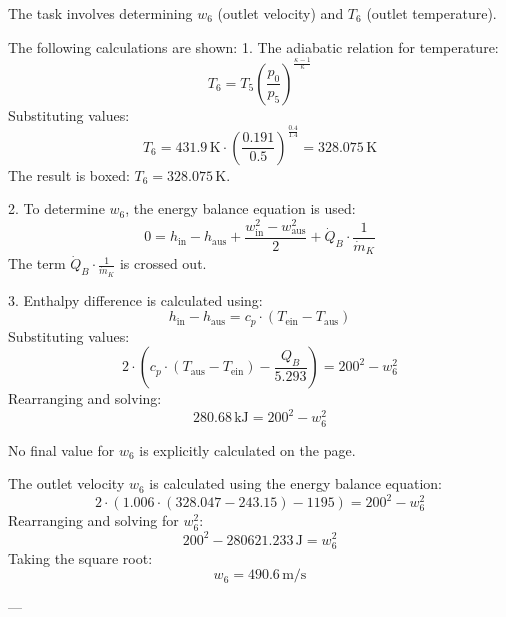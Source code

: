 The task involves determining \( w_6 \) (outlet velocity) and \( T_6 \) (outlet temperature).  

The following calculations are shown:  
1. The adiabatic relation for temperature:  
   \[
   T_6 = T_5 \left( \frac{p_0}{p_5} \right)^{\frac{\kappa - 1}{\kappa}}
   \]  
   Substituting values:  
   \[
   T_6 = 431.9 \, \text{K} \cdot \left( \frac{0.191}{0.5} \right)^{\frac{0.4}{1.4}} = 328.075 \, \text{K}
   \]  
   The result is boxed: \( T_6 = 328.075 \, \text{K} \).  

2. To determine \( w_6 \), the energy balance equation is used:  
   \[
   0 = h_{\text{in}} - h_{\text{aus}} + \frac{w_{\text{in}}^2 - w_{\text{aus}}^2}{2} + \dot{Q}_B \cdot \frac{1}{\dot{m}_K}
   \]  
   The term \( \dot{Q}_B \cdot \frac{1}{\dot{m}_K} \) is crossed out.  

3. Enthalpy difference is calculated using:  
   \[
   h_{\text{in}} - h_{\text{aus}} = c_p \cdot (T_{\text{ein}} - T_{\text{aus}})
   \]  
   Substituting values:  
   \[
   2 \cdot \left( c_p \cdot (T_{\text{aus}} - T_{\text{ein}}) - \frac{Q_B}{5.293} \right) = 200^2 - w_6^2
   \]  
   Rearranging and solving:  
   \[
   280.68 \, \text{kJ} = 200^2 - w_6^2
   \]  

No final value for \( w_6 \) is explicitly calculated on the page.

The outlet velocity \( w_6 \) is calculated using the energy balance equation:  
\[
2 \cdot (1.006 \cdot (328.047 - 243.15) - 1195) = 200^2 - w_6^2
\]  
Rearranging and solving for \( w_6^2 \):  
\[
200^2 - 280621.233 \, \text{J} = w_6^2
\]  
Taking the square root:  
\[
w_6 = 490.6 \, \text{m/s}
\]  

---